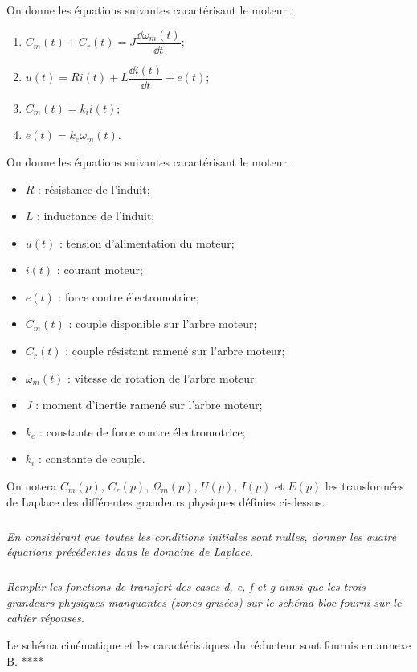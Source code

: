 \documentclass[10pt,fleqn]{article} %
\begin{document}
\begin{multicols}{2}
On donne les équations suivantes caractérisant le moteur :
\begin{enumerate}
\item $C_m(t)+C_r(t)=J\dfrac{\dd \omega_m(t)}{\dd t}$;
\item $u(t)=Ri(t)+L\dfrac{\dd i(t)}{\dd t}+e(t)$;
\item $C_m(t)=k_i i(t)$;
\item $e(t)=k_e\omega_m(t)$.
\end{enumerate}

On donne les équations suivantes caractérisant le moteur :

\begin{itemize}
\item $R$ : résistance de l'induit;
\item $L$ : inductance de l'induit;
\item $u(t)$ : tension d'alimentation du moteur;
\item $i(t)$ : courant moteur;
\item $e(t)$ : force contre électromotrice;
\item $C_m(t)$ : couple disponible sur l'arbre moteur;
\item $C_r(t)$ : couple résistant ramené sur l'arbre moteur;
\item $\omega_m(t)$ : vitesse de rotation de l'arbre moteur;
\item $J$ : moment d'inertie ramené sur l'arbre moteur;
\item $k_e$ : constante de force contre électromotrice;
\item $k_i$ : constante de couple.
\end{itemize}

On notera $C_m(p)$, $C_r(p)$, $\Omega_m(p)$, $U(p)$, $I(p)$ et $E(p)$ les transformées de Laplace des différentes grandeurs physiques définies ci-dessus.

\subparagraph{}
\textit{En considérant que toutes les conditions initiales sont nulles, donner les quatre équations précédentes dans le domaine de Laplace.}

\subparagraph{}
\textit{Remplir les fonctions de transfert des cases d, e, f et g ainsi que les trois grandeurs physiques manquantes (zones grisées) sur le schéma-bloc fourni sur le cahier réponses.}

Le schéma cinématique et les caractéristiques du réducteur sont fournis en annexe B. ****


\end{multicols}
\end{document}
